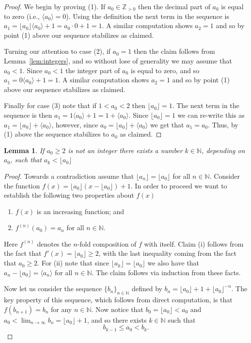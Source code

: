 \documentclass[10pt,reqno]{amsart}
\newtheorem{lemma}{Lemma}[section]
\theoremstyle{remark}
\newcommand{\floor}[1]{\lfloor #1 \rfloor}
\newcommand{\ideal}[1]{\langle #1 \rangle}
\newcommand{\N}{\mathbb{N}}
\newcommand{\Z}{\mathbb{Z}}
\begin{document}
\begin{proof}
We begin by proving (1). If $a_{0}\in \Z_{>0}$ then the decimal part of $a_{0}$ is equal to zero (i.e., $\ideal{a_{0}}=0$). Using the definition the next term in the sequence is $a_{1}=\floor{a_{0}}\ideal{a_{0}}+1=a_{0}\cdot 0 + 1 = 1$. A similar computation shows $a_{2}=1$ and so by point (1) above our sequence stabilizes as claimed. 

Turning our attention to case (2), if $a_{0}=1$ then the claim follows from Lemma~\ref{lem:integers}, and so without lose of generality we may assume that $a_{0}<1$. Since $a_{0}<1$ the integer part of $a_{0}$ is equal to zero, and so $a_{1}=0\ideal{a_{0}}+1=1$. A similar computation shows $a_{2}=1$ and so by point (1) above our sequence stabilizes as claimed. 

Finally for case (3) note that if $1<a_{0}<2$ then $\floor{a_{0}}=1$. The next term in the sequence is then $a_{1}=1\ideal{a_{0}}+1=1+\ideal{a_{0}}$. Since $\floor{a_{0}}=1$ we can re-write this as $a_{1}=\floor{a_{0}}+\ideal{a_{0}}$, however, since $a_{0}=\floor{a_{0}}+\ideal{a_{0}}$ we get that $a_{1}=a_{0}$. Thus, by (1) above the sequence stabilizes to $a_{0}$ as claimed. 
\end{proof}


\begin{lemma}\label{lem:floor}
If $a_{0}\geq2$ is not an integer there exists a number $k\in \N$, depending on $a_{0}$, such that $a_{k} < \floor{a_{0}}$
\end{lemma}

\begin{proof}
Towards a contradiction assume that $\floor{a_{n}}=\floor{a_{0}}$ for all $n\in \N$. Consider the function $f(x)=\floor{a_{0}}\left(x-\floor{a_{0}}\right)+1$. In order to proceed we want to establish the following two properties about $f(x)$
\begin{enumerate}
\item $f(x)$ is an increasing function; and
\item $f^{(n)}(a_{0})=a_{n}$ for all $n\in \N$. 
\end{enumerate}
Here $f^{(n)}$ denotes the $n$-fold composition of $f$ with itself. Claim (i) follows from the fact that $f'(x)=\floor{a_{0}}\geq2$, with the last inequality coming from the fact that $a_{0}\geq2$. For (ii) note that since $\floor{a_{k}}=\floor{a_{0}}$ we also have that $a_{n}-\floor{a_{0}}=\ideal{a_{n}}$ for all $n\in \N$. The claim follows via induction from these facts. 

Now let us consider the sequence $\{b_{n}\}_{n\in \N}$ defined by $b_{n}=\floor{a_{0}}+1+\floor{a_{0}}^{-n}$. The key property of this sequence, which follows from direct computation, is that $f(b_{n+1})=b_{n}$ for any $n\in \N$. Now notice that $b_{0}=\floor{a_{0}}<a_{0}$ and $a_{0}< \lim_{n\to \infty}b_{n}= \floor{a_{0}}+1$, and so there exists $k\in \N$ such that 
\[
b_{k-1} \leq a_{0} < b_{k}.
\]
\end{proof}
\end{document}
